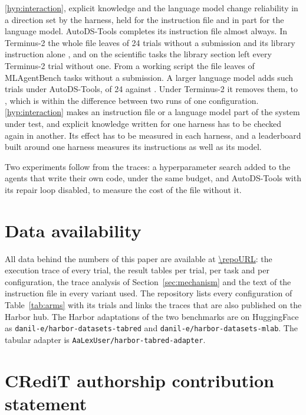 \ref{hyp:interaction}, explicit knowledge and the language model change
reliability in a direction set by the harness, held for the instruction file and in part
for the language model. AutoDS-Tools
completes its instruction file almost always. In Terminus-2 the whole file
leaves \ktBothLost{} of 24 trials without a submission and its library
instruction alone \ktToolLost{}, and on the scientific tasks the library
section left every Terminus-2 trial without one. From a working
script the file leaves \mlabWiped{} of \mlabRepeated{} MLAgentBench tasks
without a submission. A larger language model adds such trials under
AutoDS-Tools, \axAutoDSBigLost{} of 24 against \axAutoDSRefLost{}. Under
Terminus-2 it removes them, \axTerminusRefLost{} to \axTerminusBigLost{},
which is within the difference between two runs of one configuration. \ref{hyp:interaction} makes an
instruction file or a language model part of the system under test, and
explicit knowledge written for one harness has to be checked again in
another. Its
effect has to be measured in each harness, and a leaderboard built around
one harness measures its instructions as well as its model.

Two experiments follow from the traces: a hyperparameter search added to the
agents that write their own code, under the same budget, and AutoDS-Tools
with its repair loop disabled, to measure the cost of the file without it.

\section*{Data availability}

\begin{sloppypar}
All data behind the numbers of this paper are available at
\url{\repoURL}: the execution trace of every trial, the result tables per
trial, per task and per configuration, the trace analysis of
Section~\ref{sec:mechanism} and the text of the instruction file in every
variant used. The repository lists
every configuration of Table~\ref{tab:arms} with its trials and links the
traces that are also published on the Harbor hub. The Harbor adaptations of
the two benchmarks are on HuggingFace as
\texttt{danil-e/harbor-datasets-tabred} and
\texttt{danil-e/harbor-datasets-mlab}. The tabular adapter is
\texttt{AaLexUser/harbor-tabred-adapter}.
\end{sloppypar}

\section*{CRediT authorship contribution statement}

